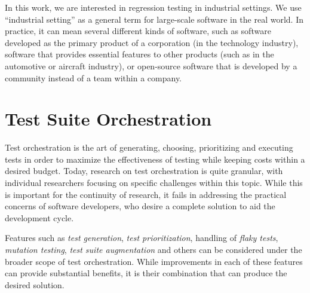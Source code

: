 In this work, we are interested in regression testing in industrial settings.
We use ``industrial setting'' as a general term for large-scale software in the real world.
In practice, it can mean several different kinds of software, such as software developed as the primary product of a corporation (in the technology industry), software that provides essential features to other products (such as in the automotive or aircraft industry), or open-source software that is developed by a community instead of a team within a company.

\section{Test Suite Orchestration}\label{sec:orchestration}
Test orchestration is the art of generating, choosing, prioritizing and executing tests in order to maximize the effectiveness of testing while keeping costs within a desired budget.
Today, research on test orchestration is quite granular, with individual researchers focusing on specific challenges within this topic.
While this is important for the continuity of research, it fails in addressing the practical concerns of software developers, who desire a complete solution to aid the development cycle.

Features such as \textit{test generation}, \textit{test prioritization}, handling of \textit{flaky tests}, \textit{mutation testing}, \textit{test suite augmentation} and others can be considered under the broader scope of test orchestration.
While improvements in each of these features can provide substantial benefits, it is their combination that can produce the desired solution.

